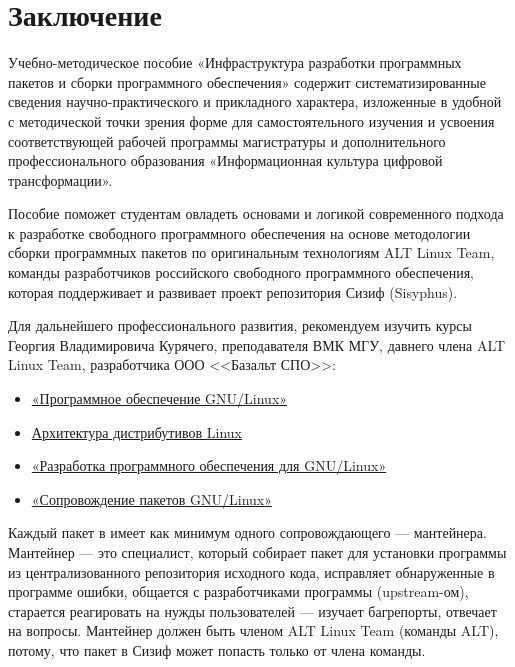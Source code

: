 \chapter{Заключение}%

Учебно-методическое пособие «Инфраструктура разработки программных пакетов и 
сборки программного обеспечения» содержит систематизированные сведения 
научно-практического и прикладного характера, изложенные в удобной с методической 
точки зрения форме для самостоятельного изучения и усвоения соответствующей рабочей 
программы магистратуры и дополнительного профессионального образования «Информационная 
культура цифровой трансформации». 

Пособие поможет студентам овладеть основами и логикой современного подхода к разработке 
свободного программного обеспечения на основе методологии сборки программных пакетов 
по оригинальным технологиям ALT Linux Team, команды разработчиков российского 
свободного программного обеспечения, которая поддерживает и развивает проект 
репозитория Сизиф (Sisyphus). 

Для дальнейшего профессионального развития, рекомендуем изучить курсы Георгия Владимировича Курячего, 
преподавателя ВМК МГУ, давнего члена ALT Linux Team, разработчика ООО <<Базальт СПО>>:
\begin{itemize}
	\item \href{http://uneex.ru/LecturesCMC/LinuxSoftware2017}{«Программное обеспечение GNU/Linux»}
	\item \href{http://uneex.ru/LecturesCMC/Distro2016}{Архитектура дистрибутивов Linux}
	\item \href{http://uneex.ru/LecturesCMC/LinuxApplicationDevelopment2022}{«Разработка программного обеспечения для GNU/Linux»}
	\item \href{http://uneex.ru/LecturesCMC/PackageMaintaining2013}{«Сопровождение пакетов GNU/Linux»}
\end{itemize}

Каждый пакет в  имеет как минимум одного сопровождающего --- мантейнера. 
Мантейнер --- это специалист, который собирает пакет для установки программы из централизованного 
репозитория исходного кода, исправляет обнаруженные в программе ошибки, общается 
с разработчиками программы (upstream-ом), старается реагировать на нужды пользователей --- 
изучает багрепорты, отвечает на вопросы. 
Мантейнер должен быть членом ALT Linux Team (команды ALT), потому, что пакет в Сизиф может 
попасть только от члена команды. 

